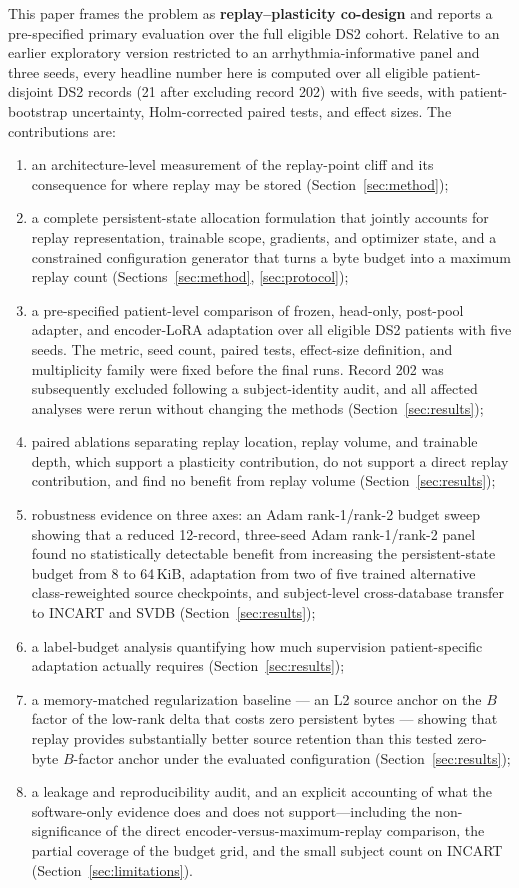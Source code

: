 This paper frames the problem as \textbf{replay--plasticity co-design} and
reports a pre-specified primary evaluation over the full eligible DS2 cohort. Relative to
an earlier exploratory version restricted to an arrhythmia-informative panel and
three seeds, every headline number here is computed over all eligible
patient-disjoint DS2 records (21 after excluding record 202) with five seeds,
with patient-bootstrap uncertainty, Holm-corrected
paired tests, and effect sizes. The contributions are:

\begin{enumerate}[leftmargin=*]
\item an architecture-level measurement of the replay-point cliff and its
consequence for where replay may be stored (Section~\ref{sec:method});
\item a complete persistent-state allocation formulation that jointly accounts
for replay representation, trainable scope, gradients, and optimizer state, and
a constrained configuration generator that turns a byte budget into a maximum
replay count (Sections~\ref{sec:method}, \ref{sec:protocol});
\item a pre-specified patient-level comparison of frozen, head-only, post-pool
adapter, and encoder-LoRA adaptation over all eligible DS2 patients with five
seeds. The metric, seed count, paired tests, effect-size definition, and multiplicity
family were fixed before the final runs. Record 202 was subsequently excluded
following a subject-identity audit, and all affected analyses were rerun without
changing the methods (Section~\ref{sec:results});
\item paired ablations separating replay location, replay volume, and trainable
depth, which support a plasticity contribution, do not support a direct replay
contribution, and find no benefit from replay volume
(Section~\ref{sec:results});
\item robustness evidence on three axes: an Adam rank-1/rank-2 budget sweep
showing that a reduced 12-record, three-seed Adam rank-1/rank-2 panel found no
statistically detectable benefit from increasing the persistent-state budget
from 8 to 64\,KiB, adaptation from
two of five trained alternative class-reweighted source checkpoints, and subject-level
cross-database transfer to INCART and SVDB (Section~\ref{sec:results});
\item a label-budget analysis quantifying how much supervision patient-specific
adaptation actually requires (Section~\ref{sec:results});
\item a memory-matched regularization baseline --- an L2 source anchor on the
$B$ factor of the low-rank delta that costs zero persistent bytes --- showing
that replay provides substantially better source retention than this tested
zero-byte $B$-factor anchor under the evaluated configuration
(Section~\ref{sec:results});
\item a leakage and reproducibility audit, and an explicit accounting of what the
software-only evidence does and does not support---including the
non-significance of the direct encoder-versus-maximum-replay comparison, the
partial coverage of the budget grid, and the small subject count on INCART
(Section~\ref{sec:limitations}).
\end{enumerate}

